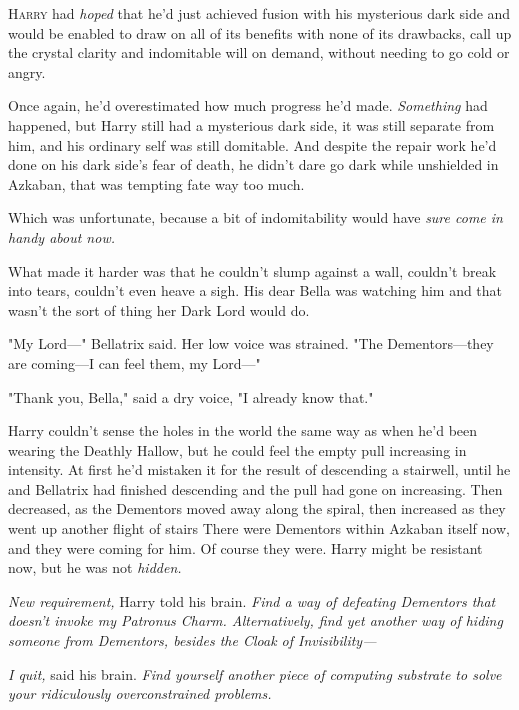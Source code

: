 
\lettrine{H}{arry} had
\emph{hoped} that he'd just achieved fusion with his mysterious dark side and
would be enabled to draw on all of its benefits with none of its drawbacks,
call up the crystal clarity and indomitable will on demand, without needing to
go cold or angry.

Once again, he'd overestimated how much progress he'd made. \emph{Something}
had happened, but Harry still had a mysterious dark side, it was still separate
from him, and his ordinary self was still domitable. And despite the repair
work he'd done on his dark side's fear of death, he didn't dare go dark while
unshielded in Azkaban, that was tempting fate way too much.

Which was unfortunate, because a bit of indomitability would have \emph{sure
come in handy about now.}

What made it harder was that he couldn't slump against a wall, couldn't break
into tears, couldn't even heave a sigh. His dear Bella was watching him and
that wasn't the sort of thing her Dark Lord would do.

"My Lord\mbox{---}" Bellatrix said. Her low voice was strained. "The Dementors---they
are coming---I can feel them, my Lord\mbox{---}"

"Thank you, Bella," said a dry voice, "I already know that."

Harry couldn't sense the holes in the world the same way as when he'd been
wearing the Deathly Hallow, but he could feel the empty pull increasing in
intensity. At first he'd mistaken it for the result of descending a stairwell,
until he and Bellatrix had finished descending and the pull had gone on
increasing. Then decreased, as the Dementors moved away along the spiral, then
increased as they went up another flight of stairs{\el} There were Dementors
within Azkaban itself now, and they were coming for him. Of course they were.
Harry might be resistant now, but he was not \emph{hidden.}

\emph{New requirement,} Harry told his brain. \emph{Find a way of defeating
Dementors that doesn't invoke my Patronus Charm. Alternatively, find yet
another way of hiding someone from Dementors, besides the Cloak of
Invisibility---}

\emph{I quit,} said his brain. \emph{Find yourself another piece of computing
substrate to solve your ridiculously overconstrained problems.}

